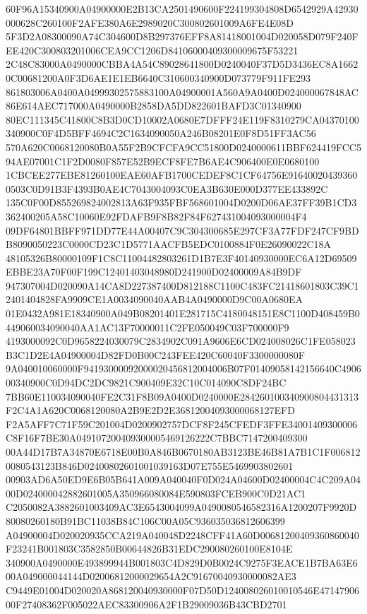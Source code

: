 \documentclass[UTF8,fontset=fandol,zihao=-4,a4paper]{ctexart}
\begin{document}
{{60F96A15340900A04900000E2B13CA2501490600F224199304808D6542929A42930000628C260100F2AFE380A6E2989020C300802601009A6FE4E08D
5F3D2A08300090A74C304600D8B297376EFF8A81418001004D020058D079F240FEE420C300803201006CEA9CC1206D84106000409300009675F53221
2C48C83000A0490000CBBA4A54C89028641800D0240040F37D5D3436EC8A16620C00681200A0F3D6AE1E1EB6640C310600340900D073779F911FE293
861803006A0400A04999302575883100A04900001A560A9A0400D024000067848AC86E614AEC717000A0490000B2858DA5DD822601BAFD3C01340900
80EC111345C41800C8B3D0CD10002A0680E7DFFF24E119F8310279CA04370100340900C0F4D5BFF4694C2C1634090050A246B08201E0F8D51FF3AC56
570A620C0068120080B0A55F2B9CFCFA9CC51800D0240000611BBF624419FCC594AE07001C1F2D0080F857E52B9ECF8FE7B6AE4C906400E0E0680100
1CBCEE277EBE81260100EAE60AFB1700CEDEF8C1CF64756E916400204393600503C0D91B3F4393B0AE4C7043004093C0EA3B630E000D377EE433892C
135C0F00D855269824002813A63F935FBF568601004D0200D06AE37FF39B1CD3362400205A58C10060E92FDAFB9F8B82F84F627431004093000004F4
09DF64801BBFF971DD77E44A00407C9C304300685E297CF3A77FDF247CF9BDB8090050223C0000CD23C1D5771AACFB5EDC0100884F0E26090022C18A
48105326B80000109F1C8C11004482803261D1B7E3F40140930000EC6A12D69509EBBE23A70F00F199C12401403048980D241900D02400009A84B9DF
947307004D020090A14CA8D227387400D812188C1100C483FC21418601803C39C12401404828FA9909CE1A0034090040AAB4A0490000D9C00A0680EA
01E0432A981E18340900A049B08201401E281715C4180048151E8C1100D408459B0449060034090040AA1AC13F70000011C2FE050049C03F700000F9
4193000092C0D9658224030079C2834902C091A9606E6CD024008026C1FE058023B3C1D2E4A04900004D82FD0B00C243FEE420C60040F3300000080F
9A040010060000F94193000092000020456812004006B07F01409058142156640C490600340900C0D94DC2DC9821C900409E32C10C014090C8DF24BC
7BB60E110034090040FE2C31F8B09A0400D0240000E284260100340900804431313F2C4A1A620C0068120080A2B9E2D2E36812004093000068127EFD
F2A5AFF7C71F59C201004D0200902757DCF8F245CFEDF3FFE34001409300006C8F16F7BE30A049107200409300005469126222C7BBC7147200409300
00A44D17B7A34870E6718E00B0A846B0670180AB3123BE46B81A7B1C1F0068120080543123B846D02400802601001039163D07E755E5469903802601
00903AD6A50ED9E6B05B641A009A040040F0D024A04600D02400004C4C209A0400D024000042882601005A350966080084E590803FCEB900C0D21AC1
C2050082A3882601003409AC3E6543004099A0490080546582316A1200207F9920D80080260180B91BC11038B84C106C00A05C936035036812606399
A04900004D020020935CCA219A040048D2248CFF41A60D00681200409360860040F23241B001803C3582850B00644826B31EDC290080260100E8104E
340900A0490000E493899944B001803C4D829D0B0024C9275F3EACE1B7BA63E600A049000044144D02006812000029654A2C91670040930000082AE3
C9449E01004D020020A868120040930000F07D50D124008026010010546E4714790600F27408362F005022AEC83300906A2F1B29009036B43CBD2701
}}
\end{document}
